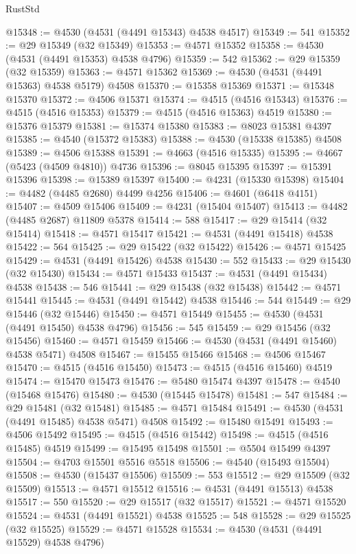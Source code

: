 \begin{lexlean}{RustStd}
\begin{coremodule}
{\begin{coremodule}
{{{{{{{{{{{{{{{{{{{{{{{{{{{{{{{{{{{{{{{{{{{{{{{{{{{{{{{@15348 := @4530 (@4531 (@4491 @15343) @4538 @4517)
@15349 := 541
@15352 := @29 @15349 (@32 @15349)
@15353 := @4571 @15352
@15358 := @4530 (@4531 (@4491 @15353) @4538 @4796)
@15359 := 542
@15362 := @29 @15359 (@32 @15359)
@15363 := @4571 @15362
@15369 := @4530 (@4531 (@4491 @15363) @4538 @5179) @4508
@15370 := @15358 @15369
@15371 := @15348 @15370
@15372 := @4506 @15371
@15374 := @4515 (@4516 @15343)
@15376 := @4515 (@4516 @15353)
@15379 := @4515 (@4516 @15363) @4519
@15380 := @15376 @15379
@15381 := @15374 @15380
@15383 := @8023 @15381 @4397
@15385 := @4540 (@15372 @15383)
@15388 := @4530 (@15338 @15385) @4508
@15389 := @4506 @15388
@15391 := @4663 (@4516 @15335)
@15395 := @4667 (@5423 (@4509 @4810)) @4736
@15396 := @8045 @15395
@15397 := @15391 @15396
@15398 := @15389 @15397
@15400 := @4231 (@15330 @15398)
@15404 := @4482 (@4485 @2680) @4499 @4256
@15406 := @4601 (@6418 @4151)
@15407 := @4509 @15406
@15409 := @4231 (@15404 @15407)
@15413 := @4482 (@4485 @2687) @11809 @5378
@15414 := 588
@15417 := @29 @15414 (@32 @15414)
@15418 := @4571 @15417
@15421 := @4531 (@4491 @15418) @4538
@15422 := 564
@15425 := @29 @15422 (@32 @15422)
@15426 := @4571 @15425
@15429 := @4531 (@4491 @15426) @4538
@15430 := 552
@15433 := @29 @15430 (@32 @15430)
@15434 := @4571 @15433
@15437 := @4531 (@4491 @15434) @4538
@15438 := 546
@15441 := @29 @15438 (@32 @15438)
@15442 := @4571 @15441
@15445 := @4531 (@4491 @15442) @4538
@15446 := 544
@15449 := @29 @15446 (@32 @15446)
@15450 := @4571 @15449
@15455 := @4530 (@4531 (@4491 @15450) @4538 @4796)
@15456 := 545
@15459 := @29 @15456 (@32 @15456)
@15460 := @4571 @15459
@15466 := @4530 (@4531 (@4491 @15460) @4538 @5471) @4508
@15467 := @15455 @15466
@15468 := @4506 @15467
@15470 := @4515 (@4516 @15450)
@15473 := @4515 (@4516 @15460) @4519
@15474 := @15470 @15473
@15476 := @5480 @15474 @4397
@15478 := @4540 (@15468 @15476)
@15480 := @4530 (@15445 @15478)
@15481 := 547
@15484 := @29 @15481 (@32 @15481)
@15485 := @4571 @15484
@15491 := @4530 (@4531 (@4491 @15485) @4538 @5471) @4508
@15492 := @15480 @15491
@15493 := @4506 @15492
@15495 := @4515 (@4516 @15442)
@15498 := @4515 (@4516 @15485) @4519
@15499 := @15495 @15498
@15501 := @5504 @15499 @4397
@15504 := @4703 @15501 @5516 @5518
@15506 := @4540 (@15493 @15504)
@15508 := @4530 (@15437 @15506)
@15509 := 553
@15512 := @29 @15509 (@32 @15509)
@15513 := @4571 @15512
@15516 := @4531 (@4491 @15513) @4538
@15517 := 550
@15520 := @29 @15517 (@32 @15517)
@15521 := @4571 @15520
@15524 := @4531 (@4491 @15521) @4538
@15525 := 548
@15528 := @29 @15525 (@32 @15525)
@15529 := @4571 @15528
@15534 := @4530 (@4531 (@4491 @15529) @4538 @4796)
}}}}}}}}}}}}}}}}}}}}}}}}}}}}}}}}}}}}}}}}}}}}}}}}}}}}}}}
\end{coremodule}}
\end{coremodule}
\end{lexlean}
